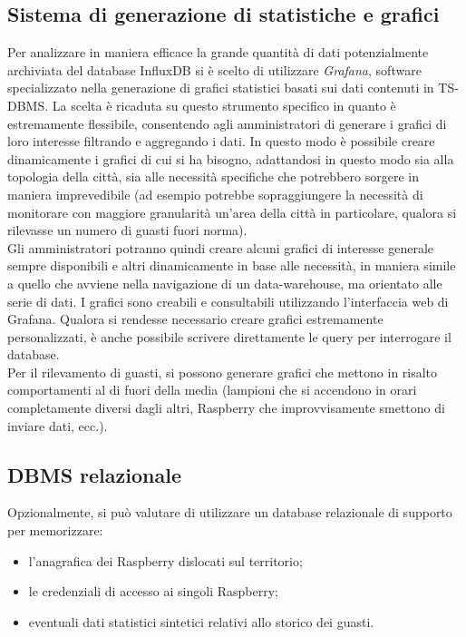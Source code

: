 \subsection{Sistema di generazione di statistiche e grafici}
Per analizzare in maniera efficace la grande quantità di dati potenzialmente archiviata del database InfluxDB si è scelto di utilizzare \textit{Grafana}, software specializzato nella generazione di grafici statistici basati sui dati contenuti in TS-DBMS.
La scelta è ricaduta su questo strumento specifico in quanto è estremamente flessibile, consentendo agli amministratori di generare i grafici di loro interesse filtrando e aggregando i dati.
In questo modo è possibile creare dinamicamente i grafici di cui si ha bisogno, adattandosi in questo modo sia alla topologia della città, sia alle necessità specifiche che potrebbero sorgere in maniera imprevedibile (ad esempio potrebbe sopraggiungere la necessità di monitorare con maggiore granularità un'area della città in particolare, qualora si rilevasse un numero di guasti fuori norma).
\\Gli amministratori potranno quindi creare alcuni grafici di interesse generale sempre disponibili e altri dinamicamente in base alle necessità, in maniera simile a quello che avviene nella navigazione di un data-warehouse, ma orientato alle serie di dati.
I grafici sono creabili e consultabili utilizzando l'interfaccia web di Grafana. Qualora si rendesse necessario creare grafici estremamente personalizzati, è anche possibile scrivere direttamente le query per interrogare il database.
\\Per il rilevamento di guasti, si possono generare grafici che mettono in risalto comportamenti al di fuori della media (lampioni che si accendono in orari completamente diversi dagli altri, Raspberry che improvvisamente smettono di inviare dati, ecc.).

\subsection{DBMS relazionale}
Opzionalmente, si può valutare di utilizzare un database relazionale di supporto per memorizzare:
\begin{itemize}
 \item l'anagrafica dei Raspberry dislocati sul territorio;
 \item le credenziali di accesso ai singoli Raspberry;
 \item eventuali dati statistici sintetici relativi allo storico dei guasti.
\end{itemize}


